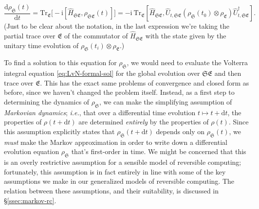 \documentclass[preprints,article,accept,moreauthors,pdftex]{Definitions/mdpi}
\begin{document}
\begin{paracol}{2}
\begin{equation}
    \label{eq:open-LvN-eq}
    \frac{\mathrm{d}\rho_{\mathfrak{S}}\left(t\right)}{\mathrm{d}t} = \mathrm{Tr}_{\mathfrak{E}}\bigg[-\mathrm{i}\left[\widehat{H}_{\mathfrak{SE}},\rho_{\mathfrak{SE}}\left(t\right)\right]\bigg] = -\mathrm{i}\:\mathrm{Tr}_{\mathfrak{E}}\left[\widehat{H}_{\mathfrak{SE}},\widehat{U}_{t,\mathfrak{SE}}\left(\rho_{\mathfrak{S}}\left(t_{0}\right)\otimes\rho_{\mathfrak{E}}\right)\widehat{U}_{t,\mathfrak{SE}}^{\dagger}\right].
\end{equation}
(Just to be clear about the notation, in the last expression we're taking the partial trace over $\mathfrak{E}$ of the commutator of $\widehat{H}_{\mathfrak{SE}}$ with the state given by the unitary time evolution of $\rho_{\mathfrak{S}}\left(t_i\right)\otimes \rho_{\mathfrak{E}}$.)

To find a solution to this equation for $\rho_{\mathfrak{S}}$, we would need to evaluate the Volterra integral equation \eqref{eq:LvN-formal-sol} for the global evolution over $\mathfrak{SE}$ and then trace over $\mathfrak{E}$. This has the exact same problems of convergence and closed form as before, since we haven't changed the problem itself. Instead, as a first step to determining the dynamics of $\rho_{\mathfrak{S}}$, we can make the simplifying assumption of \emph{Markovian dynamics}; \emph{i.e.}, that over a differential time evolution $t\mapsto t + \mathrm{d}t$, the properties of $\rho\left(t + \mathrm{d}t\right)$ are determined \emph{entirely} by the properties of $\rho\left(t\right)$. Since this assumption explicitly states that $\rho_{\mathfrak{S}}\left(t+\mathrm{d}t\right)$ depends only on $\rho_{\mathfrak{S}}\left(t\right)$, we \emph{must} make the Markov approximation in order to write down a differential evolution equation $\rho_{\mathfrak{S}}$ that's first-order in time. We might be concerned that this is an overly restrictive assumption for a sensible model of reversible computing; fortunately, this assumption is in fact entirely in line with some of the key assumptions we make in our generalized models of reversible computing. The relation between these assumptions, and their suitability, is discussed in \S\ref{ssec:markov-rc}.


\end{paracol}
\end{document}
